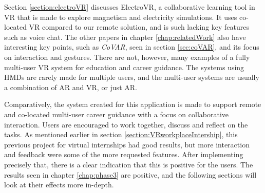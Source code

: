 Section \ref{section:electroVR} discusses ElectroVR, a collaborative learning tool in VR that is made to explore magnetism and electricity simulations. It uses co-located VR compared to our remote solution, and is such lacking key features such as voice chat. The other papers in chapter \ref{chap:relatedWork} also have interesting key points, such as \textit{CoVAR}, seen in section \ref{sec:coVAR}, and its focus on interaction and gestures. There are not, however, many examples of a fully multi-user VR system for education and career guidance. The systems using HMDs are rarely made for multiple users, and the multi-user systems are usually a combination of AR and VR, or just AR.

Comparatively, the system created for this application is made to support remote and co-located multi-user career guidance with a focus on collaborative interaction. Users are encouraged to work together, discuss and reflect on the tasks. As mentioned earlier in section \ref{section:VRworkplaceIntership}, this previous project for virtual internships had good results, but more interaction and feedback were some of the more requested features. After implementing precisely that, there is a clear indication that this is positive for the users. The results seen in chapter \ref{chap:phase3} are positive, and the following sections will look at their effects more in-depth.

